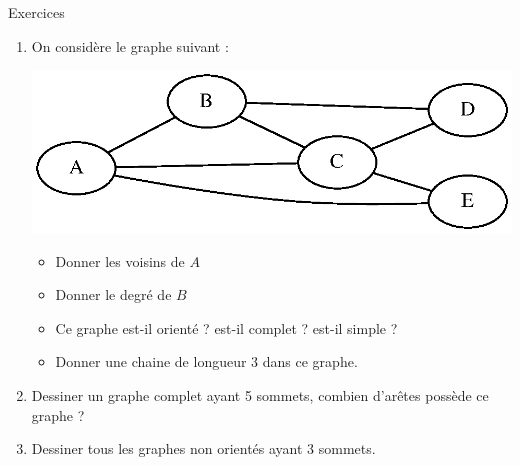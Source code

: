 \documentclass[10pt]{beamer}
\begin{document}
\begin{frame}
	\mframe{\GR}
	\begin{exampleblock}{Exercices}
		\begin{enumerate}
			\item On considère le graphe suivant : \\
			      \begin{center}
				      \includegraphics[scale=0.4]{graph2.eps}
			      \end{center}
			      \begin{itemize}
				      \item<2-> Donner les voisins de $A$
				      \item<3-> Donner le degré de $B$
				      \item<4-> Ce graphe est-il orienté ? est-il complet ? est-il simple ?
				      \item<5-> Donner une chaine de longueur 3 dans ce graphe.
			      \end{itemize}
			\item<6-> Dessiner un graphe complet ayant 5 sommets, combien d'arêtes possède ce graphe ?
			\item<7-> Dessiner tous les graphes non orientés ayant 3 sommets.
		\end{enumerate}
	\end{exampleblock}
\end{frame}
\end{document}
